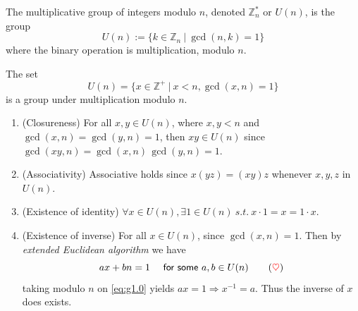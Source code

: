 \begin{definition}
    The multiplicative group of integers modulo $n$, denoted $\mathbb{Z}^*_n$ or $U(n)$, is the group 
    \[
        U(n) := \{ k \in \mathbb{Z}_n \> | \> \gcd(n,k) = 1 \}
    \]
    where the binary operation is multiplication, modulo $n$.
\end{definition}

\begin{example}
    The set 
    \[
        U(n) = \{ x \in \mathbb{Z}^+ \> | \> x < n, \gcd(x,n) = 1 \}
    \]
    is a group under multiplication modulo $n$.
\end{example}
\begin{solution}
    \begin{enumerate}
        \item (Closureness) For all $x, y \in U(n)$, where $x,y < n$ and $\gcd(x,n) = \gcd(y,n) = 1$, then 
        $xy \in U(n)$ since $\gcd(xy,n) = \gcd(x,n)\, \gcd(y,n) = 1$.

        \item (Associativity) Associative holds since $x(yz) = (xy)z$ whenever $x,y,z$ in $U(n)$.
        \item (Existence of identity) $\forall x \in U(n), \exists 1 \in U(n) \> s.t. \> x \cdot 1 = x = 1 \cdot x$.
        \item (Existence of inverse) For all $x \in U(n)$, since $\gcd(x,n) = 1$. Then by \textit{extended Euclidean algorithm} we have 
        \[
            ax + bn = 1 \quad \textsf{ for some } a,b \in U(n) \label{eq:g1.0} \tag{{\color{red} $\heartsuit$}}
        \]
        taking modulo $n$ on \eqref{eq:g1.0} yields $ax = 1 \Longrightarrow x^{-1} = a$. Thus the inverse of $x$ does exists.
    \end{enumerate}
\end{solution}

